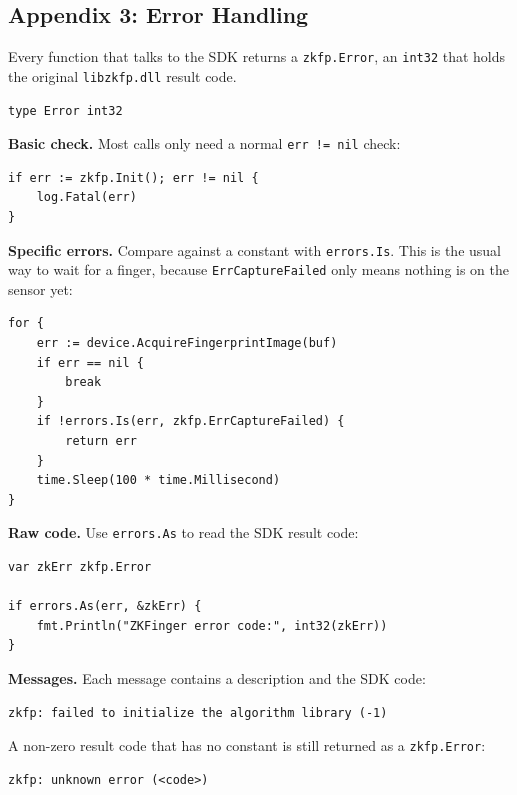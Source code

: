 \documentclass[11pt, a4paper]{article}
\begin{document}
\subsection{Appendix 3: Error Handling}
Every function that talks to the SDK returns a \texttt{zkfp.Error}, an \texttt{int32} that holds the original \texttt{libzkfp.dll} result code.

\begin{lstlisting}
type Error int32
\end{lstlisting}

\textbf{Basic check.} Most calls only need a normal \texttt{err != nil} check:
\begin{lstlisting}
if err := zkfp.Init(); err != nil {
    log.Fatal(err)
}
\end{lstlisting}

\textbf{Specific errors.} Compare against a constant with \texttt{errors.Is}. This is the usual way to wait for a finger, because \texttt{ErrCaptureFailed} only means nothing is on the sensor yet:
\begin{lstlisting}
for {
    err := device.AcquireFingerprintImage(buf)
    if err == nil {
        break
    }
    if !errors.Is(err, zkfp.ErrCaptureFailed) {
        return err
    }
    time.Sleep(100 * time.Millisecond)
}
\end{lstlisting}

\textbf{Raw code.} Use \texttt{errors.As} to read the SDK result code:
\begin{lstlisting}
var zkErr zkfp.Error

if errors.As(err, &zkErr) {
    fmt.Println("ZKFinger error code:", int32(zkErr))
}
\end{lstlisting}

\textbf{Messages.} Each message contains a description and the SDK code:
\begin{lstlisting}
zkfp: failed to initialize the algorithm library (-1)
\end{lstlisting}

A non-zero result code that has no constant is still returned as a \texttt{zkfp.Error}:
\begin{lstlisting}
zkfp: unknown error (<code>)
\end{lstlisting}
\end{document}
